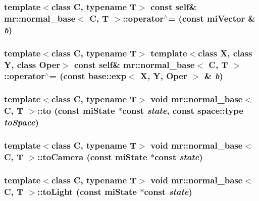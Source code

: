 \subsubsection{\setlength{\rightskip}{0pt plus 5cm}template$<$class C, typename T$>$ const {\bf self}\& {\bf mr::normal\_\-base}$<$ C, T $>$::operator$^\wedge$= (const mi\-Vector \& {\em b})\hspace{0.3cm}{\tt  [inline]}}\label{structmr_1_1normal__base_z73_1}


\subsubsection{\setlength{\rightskip}{0pt plus 5cm}template$<$class C, typename T$>$ template$<$class X, class Y, class Oper$>$ const {\bf self}\& {\bf mr::normal\_\-base}$<$ C, T $>$::operator$^\wedge$= (const {\bf base::exp}$<$ X, Y, Oper $>$ \& {\em b})\hspace{0.3cm}{\tt  [inline]}}\label{structmr_1_1normal__base_z73_0}


\subsubsection{\setlength{\rightskip}{0pt plus 5cm}template$<$class C, typename T$>$ void {\bf mr::normal\_\-base}$<$ C, T $>$::to (const mi\-State $\ast$const {\em state}, const {\bf space::type} {\em to\-Space})\hspace{0.3cm}{\tt  [inline]}}\label{structmr_1_1normal__base_a12}


\subsubsection{\setlength{\rightskip}{0pt plus 5cm}template$<$class C, typename T$>$ void {\bf mr::normal\_\-base}$<$ C, T $>$::to\-Camera (const mi\-State $\ast$const {\em state})\hspace{0.3cm}{\tt  [inline]}}\label{structmr_1_1normal__base_a3}


\subsubsection{\setlength{\rightskip}{0pt plus 5cm}template$<$class C, typename T$>$ void {\bf mr::normal\_\-base}$<$ C, T $>$::to\-Light (const mi\-State $\ast$const {\em state})\hspace{0.3cm}{\tt  [inline]}}\label{structmr_1_1normal__base_a6}


